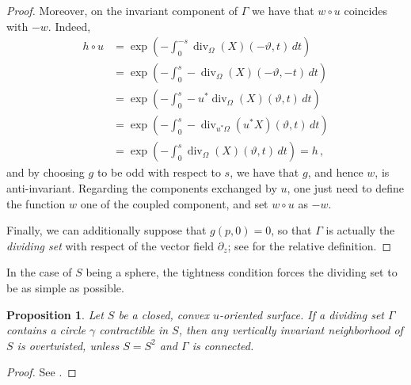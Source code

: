 \documentclass[a4paper, 11pt]{amsart}
\theoremstyle{plain}
\newtheorem{prop}{Proposition}[section]
\theoremstyle{definition}
\renewcommand{\theta}{\vartheta}
\DeclareMathOperator{\diver}{div}
\begin{document}
\begin{proof}
	Moreover, on the invariant component of $\Gamma$ we have that $w \circ u$ coincides with $-w$. Indeed,
	\[
	\begin{split}
		h \circ u &= \exp\left(-\int_0^{-s} \diver_\Omega(X)(-\theta, t)\,dt\right) \\
		&= \exp\left(-\int_0^{s} -\diver_{\Omega}(X)(-\theta, -t)\,dt\right)\\
		&= \exp\left(-\int_0^{s} - u^*\diver_\Omega(X)(\theta, t)\,dt\right)\\
		&= \exp\left(-\int_0^{s} - \diver_{u^*\Omega}(u^*X)(\theta, t)\,dt\right)\\
		&= \exp\left(-\int_0^{s} \diver_\Omega(X)(\theta, t)\,dt\right) = h\,,
	\end{split}
	\]
	and by choosing $g$ to be odd with respect to $s$, we have that $g$, and hence $w$, is anti-invariant. Regarding the components exchanged by $u$, one just need to define the function $w$ one of the coupled component, and set $w \circ u$ as $-w$. 
	
	Finally, we can additionally  suppose that $g(p,0) = 0$, so that $\Gamma$ is actually the \emph{dividing set} with respect of the vector field $\partial_z$; see \cite[Def.\ 4.8.1]{geigesIntroductionContactTopology2008} for the relative definition.
\end{proof}
In the case of $S$ being a sphere, the tightness condition forces the dividing set to be as simple as possible.
\begin{prop}\label{divsetS2iscircle}
	Let $S$ be a closed, convex $u$-oriented surface. If a dividing set $\Gamma$ contains a circle $\gamma$ contractible in $S$, then any vertically invariant neighborhood of $S$ is overtwisted, unless $S = S^2$ and $\Gamma$ is connected.
\end{prop}
\begin{proof}
	See \cite[Prop.\ 4.8.13]{geigesIntroductionContactTopology2008}.
\end{proof}
\end{document}
